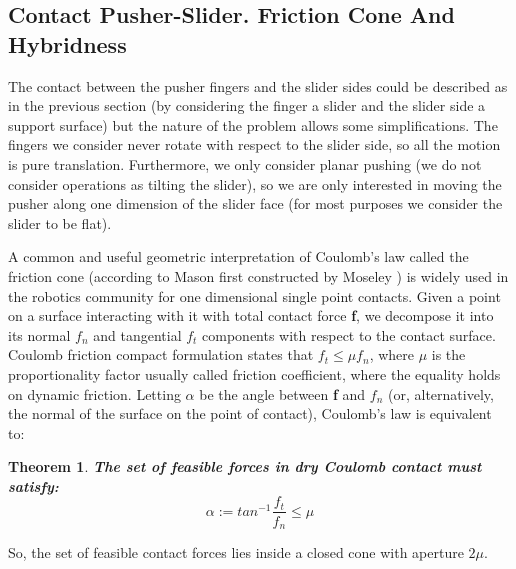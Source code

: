 \documentclass[12,twoside]{TFG-GM}
\newtheorem{theorem}{Theorem}[section]
\theoremstyle{definition}
\theoremstyle{remark}
\begin{document}
\subsection{Contact Pusher-Slider. Friction Cone And Hybridness}
\label{subsec:frictioncone}
The contact between the pusher fingers and the slider sides could be described as in the previous section (by considering the finger a slider and the slider side a support surface) but the nature of the problem allows some simplifications. The fingers we consider never rotate with respect to the slider side, so all the motion is pure translation. Furthermore, we only consider planar pushing (we do not consider operations as tilting the slider), so we are only interested in moving the pusher along one dimension of the slider face (for most purposes we consider the slider to be flat).

A common and useful geometric interpretation of Coulomb's law called the friction cone (according to Mason first constructed by Moseley \cite{moseley}) is widely used in the robotics community for one dimensional single point contacts. Given a point on a surface interacting with it with total contact force \textbf{f}, we decompose it into its normal $f_n$ and tangential $f_t$ components with respect to the contact surface. Coulomb friction compact formulation states that $f_t \leq \mu f_n$, where $\mu$ is the proportionality factor usually called friction coefficient, where the equality holds on dynamic friction. Letting $\alpha$ be the angle between \textbf{f} and $f_n$ (or, alternatively, the normal of the surface on the point of contact), Coulomb's law is equivalent to: %

\begin{theorem} \label{th:friction_cone} \textbf{The set of feasible forces in dry Coulomb contact must satisfy:}
$$\alpha := tan^{-1} \frac{f_t}{f_n} \leq \mu$$
\end{theorem}

So, the set of feasible contact forces lies inside a closed cone with aperture $2\mu$.
\end{document}

